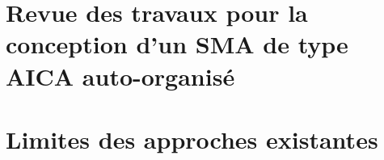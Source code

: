 \documentclass[ twoside,openright,titlepage,numbers=noenddot,headinclude,%
                footinclude=true,cleardoublepage=empty,abstractoff, %
                BCOR=5mm,paper=a4,fontsize=11pt,%
                french,american,%
                ]{scrreprt}
\begin{document}
\section{Revue des travaux pour la conception d'un SMA de type AICA auto-organisé}

\section{Limites des approches existantes}
\end{document}
